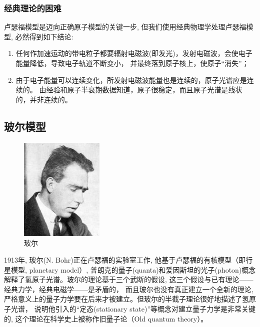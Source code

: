 \subsubsection{经典理论的困难}

卢瑟福模型是迈向正确原子模型的关键一步,
但我们使用经典物理学处理卢瑟福模型, 必然得到如下结论:


\begin{enumerate}
    \item 任何作加速运动的带电粒子都要辐射电磁波(即发光)，发射电磁波，会使电子能量降低，导致电子轨道不断变小，
并最终落到原子核上，使原子``消失''；
    \item 由于电子能量可以连续变化，所发射电磁波能量也是连续的，原子光谱应是连续的。
由经验和原子半衰期数据知道，原子很稳定，而且原子光谱是线状的，并非连续的。
\end{enumerate}


\subsection{玻尔模型}

\begin{figure}[h]
\begin{center}
\includegraphics[clip,width=4cm]{BohrModel/bohr.ps}
\caption{玻尔}
\end{center}
\end{figure}


1913年, 玻尔(N. Bohr)正在卢瑟福的实验室工作,
他基于卢瑟福的有核模型（即行星模型, planetary model）,
普朗克的量子(quanta)和爱因斯坦的光子(photon)概念解释了氢原子光谱。玻尔的理论基于三个武断的假设,
这三个假设与已有理论——经典力学，经典电磁学——是矛盾的，
而且玻尔也没有真正建立一个全新的理论,
严格意义上的量子力学要在后来才被建立。但玻尔的半截子理论很好地描述了氢原子光谱，
说明他引入的``定态(stationary
state)''等概念对建立量子力学是非常关键的,
这个理论在科学史上被称作旧量子论（Old quantum theory）。

